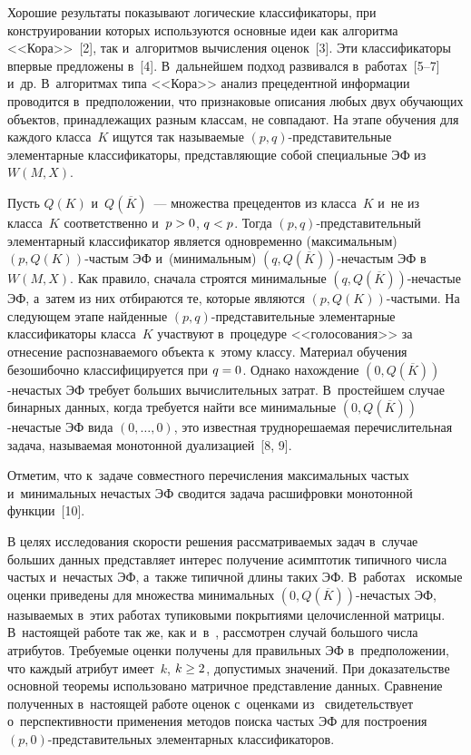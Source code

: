 \begin{multicols}{2}
  Хорошие результаты показывают логические классификаторы, при 
конструировании которых используются основные идеи как алгоритма 
<<Кора>>~[2], так и~алгоритмов вычисления оценок~[3]. Эти классификаторы 
впервые предложены в~[4]. В~дальнейшем подход развивался в~работах~[5--7] 
и~др. В~алгоритмах типа <<Кора>> анализ прецедентной информации 
проводится в~предположении, что признаковые описания любых двух 
обуча\-ющих объектов, принадлежащих разным классам, не совпадают. На этапе 
обуче\-ния для каждого класса~$K$ ищутся так называемые  
$(p,q)$-пред\-ста\-ви\-тель\-ные элементарные классификаторы, 
пред\-став\-ля\-ющие собой специальные ЭФ из~$W(M,X)$.
  
  Пусть $Q(K)$ и~$Q(\overline{K})$~--- множества прецедентов из класса~$K$ 
и~не из класса~$K$ соответственно и~$p\hm>0$, $q\hm<p$. Тогда  
$(p,q)$-пред\-ста\-ви\-тель\-ный элементарный классификатор является 
одновременно (максимальным) $(p,Q(K))$-час\-тым ЭФ и~(минимальным) 
$(q,Q(\overline{K}))$-не\-час\-тым ЭФ в~$W(M,X)$. Как правило, сначала 
строятся минимальные $(q,Q(\overline{K}))$-не\-час\-тые ЭФ, а~затем из них 
отбираются те, которые являются $(p,Q(K))$-час\-ты\-ми. На следующем этапе 
найденные $(p,q)$-пред\-ста\-ви\-тель\-ные элементарные классификаторы 
класса~$K$ участвуют в~процедуре <<голосования>> за отнесение 
распознаваемого объекта к~этому классу. Материал обучения без\-оши\-боч\-но 
классифицируется при $q\hm=0$. Однако нахождение  
$(0,Q(\overline{K}))$-не\-час\-тых ЭФ требует больших вычислительных 
затрат. В~простейшем случае бинарных данных, когда требуется найти все 
минимальные $(0,Q(\overline{K}))$-не\-час\-тые ЭФ вида $(0, \ldots , 0)$, это 
известная труднорешаемая перечислительная задача, называемая монотонной 
дуализацией~[8, 9].
  
  Отметим, что к~задаче совместного перечисления максимальных частых 
  и~минимальных не\-час\-тых ЭФ сводится задача расшифровки монотонной 
функции~[10].
  
  В целях исследования скорости решения рассматриваемых задач в~случае 
больших данных представляет интерес получение асимптотик типичного числа 
частых и~нечастых ЭФ, а~также типичной длины таких ЭФ.  
В~работах~\cite{5-duk, 6-duk} искомые оценки приведены для множества 
минимальных $(0,Q(\overline{K}))$-не\-час\-тых ЭФ, называемых в~этих 
работах тупиковыми покрытиями целочисленной матрицы. В~настоящей 
работе так же, как и~в~\cite{5-duk, 6-duk}, рассмотрен случай большого чис\-ла 
атрибутов. Требуемые оценки получены для правильных ЭФ в~предположении, 
что каж\-дый атрибут имеет~$k$, $k\hm \geq 2$, до\-пус\-ти\-мых значений. При 
доказательстве основной тео\-ре\-мы использовано мат\-рич\-ное пред\-став\-ле\-ние 
данных. Сравнение полученных в~на\-сто\-ящей работе оценок с~оценками  
из~\cite{5-duk, 6-duk} свидетельствует о~перспективности применения методов 
поиска час\-тых ЭФ для построения $(p,0)$-пред\-ста\-ви\-тель\-ных 
элементарных классификаторов.
  

\end{multicols}
